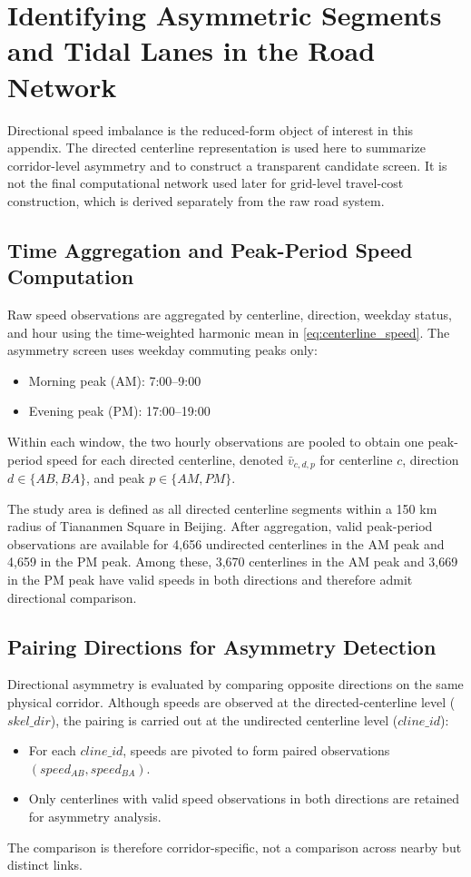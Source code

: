 \documentclass[12pt]{article}
\begin{document}
	\clearpage

	
	\section{Identifying Asymmetric Segments and Tidal Lanes in the Road Network}
	\label{sec:asym_sec}
	Directional speed imbalance is the reduced-form object of interest in this appendix. The directed centerline representation is used here to summarize corridor-level asymmetry and to construct a transparent candidate screen. It is not the final computational network used later for grid-level travel-cost construction, which is derived separately from the raw road system.
	
	\subsection{Time Aggregation and Peak-Period Speed Computation}
	
	Raw speed observations are aggregated by centerline, direction, weekday status, and hour using the time-weighted harmonic mean in \eqref{eq:centerline_speed}. The asymmetry screen uses weekday commuting peaks only:
	\begin{itemize}
		\item Morning peak (AM): 7:00--9:00
		\item Evening peak (PM): 17:00--19:00
	\end{itemize}
	Within each window, the two hourly observations are pooled to obtain one peak-period speed for each directed centerline, denoted $\bar{v}_{c,d,p}$ for centerline $c$, direction $d \in \{AB, BA\}$, and peak $p \in \{AM, PM\}$.
	
	The study area is defined as all directed centerline segments within a 150 km radius of Tiananmen Square in Beijing. After aggregation, valid peak-period observations are available for 4,656 undirected centerlines in the AM peak and 4,659 in the PM peak. Among these, 3,670 centerlines in the AM peak and 3,669 in the PM peak have valid speeds in both directions and therefore admit directional comparison.
	
	\subsection{Pairing Directions for Asymmetry Detection}
	
	Directional asymmetry is evaluated by comparing opposite directions on the same physical corridor. Although speeds are observed at the directed-centerline level ($skel\_dir$), the pairing is carried out at the undirected centerline level ($cline\_id$):
	\begin{itemize}
		\item For each $cline\_id$, speeds are pivoted to form paired observations $(speed_{AB}, speed_{BA})$.
		\item Only centerlines with valid speed observations in both directions are retained for asymmetry analysis.
	\end{itemize}
	The comparison is therefore corridor-specific, not a comparison across nearby but distinct links.
	
\end{document}
